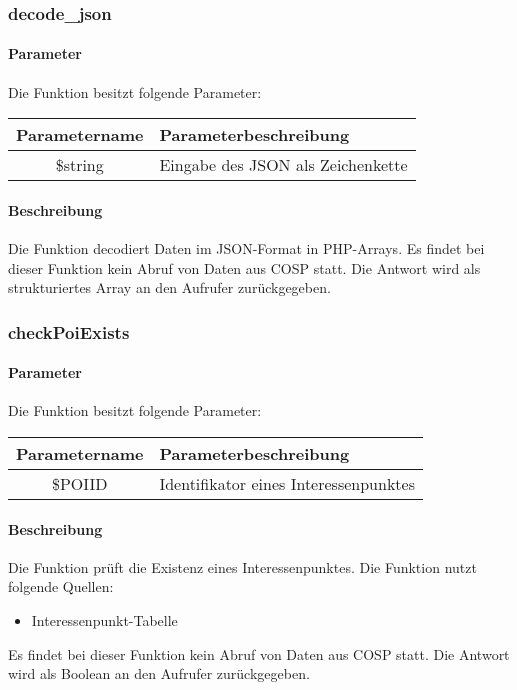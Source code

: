 \subsubsection{decode\_json}
\paragraph{Parameter} Die Funktion besitzt folgende Parameter:
\begin{table}[H]
	\begin{tabular}{|c|p{11cm}|}
		\hline
		\textbf{Parametername} & \textbf{Parameterbeschreibung} \\ \hline
		\$string & Eingabe des JSON als Zeichenkette \\ \hline
	\end{tabular}
\end{table}
\paragraph{Beschreibung} Die Funktion decodiert Daten im JSON-Format in PHP-Arrays. Es findet bei dieser Funktion kein Abruf von Daten aus {\glqq COSP\grqq} statt. Die Antwort wird als strukturiertes Array an den Aufrufer zurückgegeben.
\subsubsection{checkPoiExists}
\paragraph{Parameter} Die Funktion besitzt folgende Parameter:
\begin{table}[H]
	\begin{tabular}{|c|p{11cm}|}
		\hline
		\textbf{Parametername} & \textbf{Parameterbeschreibung} \\ \hline
		\$POIID & Identifikator eines Interessenpunktes \\ \hline
	\end{tabular}
\end{table}
\paragraph{Beschreibung} Die Funktion prüft die Existenz eines Interessenpunktes. Die Funktion nutzt folgende Quellen:
\begin{itemize}
	\item Interessenpunkt-Tabelle
\end{itemize}
Es findet bei dieser Funktion kein Abruf von Daten aus {\glqq COSP\grqq} statt. Die Antwort wird als Boolean an den Aufrufer zurückgegeben.
